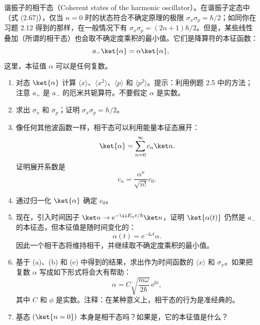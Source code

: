 \begin{question}
谐振子的相干态（Coherent states of the harmonic oscillator）。在谐振子定态中（式 (2.67)），仅当 $n=0$ 时的状态符合不确定原理的极限 $\sigma_x\sigma_p=\hbar/2$；如同你在习题 2.12 得到的那样，在一般情况下有 $\sigma_x\sigma_p=(2n+1)\hbar/2$。但是，某些线性叠加（所谓的相干态）也会取不确定度乘积的最小值。它们是降算符的本征函数：
\[
a_-\ket{\alpha}=\alpha\ket{\alpha},
\]
这里，本征值 $\alpha$ 可以是任何复数。
\begin{enumerate}
\item 对态 $\ket{\alpha}$ 计算 $\langle x\rangle$、$\langle x^2\rangle$、$\langle p\rangle$ 和 $\langle p^2\rangle$。提示：利用例题 2.5 中的方法；注意 $a_+$ 是 $a_-$ 的厄米共轭算符。不要假定 $\alpha$ 是实数。
\item 求出 $\sigma_x$ 和 $\sigma_p$；证明 $\sigma_x\sigma_p=\hbar/2$。
\item 像任何其他波函数一样，相干态可以利用能量本征态展开：
\[
\ket{\alpha}=\sum_{n=0}^{\infty}c_n\ket n.
\]
证明展开系数是
\[
c_n=\frac{\alpha^n}{\sqrt{n!}}c_0.
\]
\item 通过归一化 $\ket{\alpha}$ 确定 $c_0$。
\item 现在，引入时间因子 $\ket n\to \mathrm e^{-\ii E_nt/\hbar}\ket n$，证明 $\ket{\alpha(t)}$ 仍然是 $a_-$ 的本征态，但本征值是随时间变化的：
\[
\alpha(t)=\mathrm e^{-\ii\omega t}\alpha.
\]
因此一个相干态将维持相干，并继续取不确定度乘积的最小值。
\item 基于 (a)、(b) 和 (e) 中得到的结果，求出作为时间函数的 $\langle x\rangle$ 和 $\sigma_x$。如果把复数 $\alpha$ 写成如下形式将会大有帮助：
\[
\alpha=C\sqrt{\frac{m\omega}{2\hbar}}\,\mathrm e^{\ii\phi},
\]
其中 $C$ 和 $\phi$ 是实数。注释：在某种意义上，相干态的行为是准经典的。
\item 基态 $(\ket{n=0})$ 本身是相干态吗？如果是，它的本征值是什么？
\end{enumerate}

\par\smallskip
{}

\end{question}
